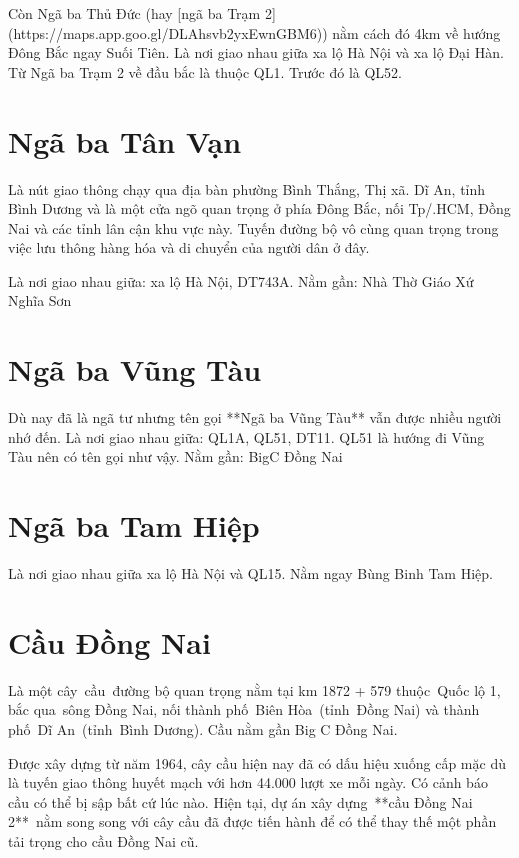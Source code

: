 Còn Ngã ba Thủ Đức (hay [ngã ba Trạm 2](https://maps.app.goo.gl/DLAhsvb2yxEwnGBM6)) nằm cách đó 4km về hướng Đông Bắc ngay Suối Tiên. Là nơi giao nhau giữa xa lộ Hà Nội và xa lộ Đại Hàn. Từ Ngã ba Trạm 2 về đầu bắc là thuộc QL1. Trước đó là QL52.

\section{Ngã ba Tân Vạn}

Là nút giao thông chạy qua địa bàn phường Bình Thắng, Thị xã. Dĩ An, tỉnh Bình Dương và là một cửa ngõ quan trọng ở phía Đông Bắc, nối Tp/.HCM, Đồng Nai và các tỉnh lân cận khu vực này. Tuyến đường bộ vô cùng quan trọng trong việc lưu thông hàng hóa và di chuyển của người dân ở đây.

Là nơi giao nhau giữa: xa lộ Hà Nội, DT743A. Nằm gần: Nhà Thờ Giáo Xứ Nghĩa Sơn

\section{Ngã ba Vũng Tàu}

Dù nay đã là ngã tư nhưng tên gọi **Ngã ba Vũng Tàu** vẫn được nhiều người nhớ đến. Là nơi giao nhau giữa: QL1A, QL51, DT11. QL51 là hướng đi Vũng Tàu nên có tên gọi như vậy. Nằm gần: BigC Đồng Nai

\section{Ngã ba Tam Hiệp}

Là nơi giao nhau giữa xa lộ Hà Nội và QL15. Nằm ngay Bùng Binh Tam Hiệp.

\section{Cầu Đồng Nai}

Là một cây cầu đường bộ quan trọng nằm tại km 1872 + 579 thuộc Quốc lộ 1, bắc qua sông Đồng Nai, nối thành phố Biên Hòa (tỉnh Đồng Nai) và thành phố Dĩ An (tỉnh Bình Dương). Cầu nằm gần Big C Đồng Nai.

Được xây dựng từ năm 1964, cây cầu hiện nay đã có dấu hiệu xuống cấp mặc dù là tuyến giao thông huyết mạch với hơn 44.000 lượt xe mỗi ngày. Có cảnh báo cầu có thể bị sập bất cứ lúc nào. Hiện tại, dự án xây dựng **cầu Đồng Nai 2** nằm song song với cây cầu đã được tiến hành để có thể thay thế một phần tải trọng cho cầu Đồng Nai cũ.

